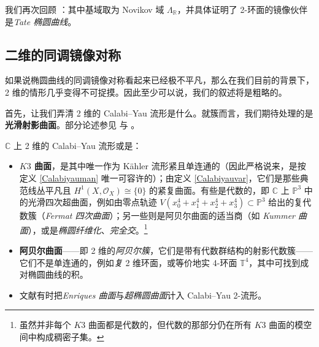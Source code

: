 
我们再次回顾 \cite[定理 6.4]{[AS09]}：其中基域取为 Novikov 域 $\Lambda_\mathbb{R}$，并具体证明了 2-环面的镜像伙伴是\textit{Tate 椭圆曲线}。


\subsection{二维的同调镜像对称}\label{ch7.4}


如果说椭圆曲线的同调镜像对称看起来已经极不平凡，那么在我们目前的背景下，2 维的情形几乎变得不可捉摸。因此至少可以说，我们的叙述将是粗略的。

首先，让我们弄清 2 维的 Calabi--Yau 流形是什么。就簇而言，我们期待处理的是\textbf{光滑射影曲面}。部分论述参见 \cite[第 5.3、21.1 节]{[GHJ03]} 与 \cite[第 10.1 节]{[Huy06]}。

\begin{Def}\label{CY2folds}
$\mathbb{C}$ 上 2 维的 Calabi--Yau 流形或是：
\begin{itemize}[leftmargin=0.5cm]
	\renewcommand{\labelitemi}{\textendash}
	\item \textbf{$K3$ 曲面}，是其中唯一作为 Kähler 流形紧且单连通的（因此严格说来，是按定义 \ref{Calabiyauman} 唯一可容许的）；由定义 \ref{Calabiyauvar}，它们是那些典范线丛平凡且 $H^1(X,\mathcal{O}_X)\cong\{0\}$ 的紧复曲面。有些是代数的，即 $\mathbb{C}$ 上 $\mathbb{P}^3$ 中的光滑四次超曲面，例如由零点轨迹 $V(x_0^4+x_1^4+x_2^4+x_3^4)\subset \mathbb{P}^3$ 给出的复代数簇（\textit{Fermat 四次曲面}）；另一些则是阿贝尔曲面的适当商（如 \textit{Kummer 曲面}），或是\textit{椭圆纤维化}、\textit{完全交}。\footnote{虽然并非每个 $K3$ 曲面都是代数的，但代数的那部分仍在所有 $K3$ 曲面的模空间中构成稠密子集。}
	
	\item \textbf{阿贝尔曲面}——即 2 维的\textit{阿贝尔簇}，它们是带有代数群结构的射影代数簇——它们不是单连通的，例如\textit{复} 2 维环面，或等价地实 4-环面 $\mathbb{T}^4$，其中可找到成对椭圆曲线的积。 
	
	\item 文献有时把\textit{Enriques 曲面}与\textit{超椭圆曲面}计入 Calabi--Yau 2-流形。  
\end{itemize}
\end{Def}

